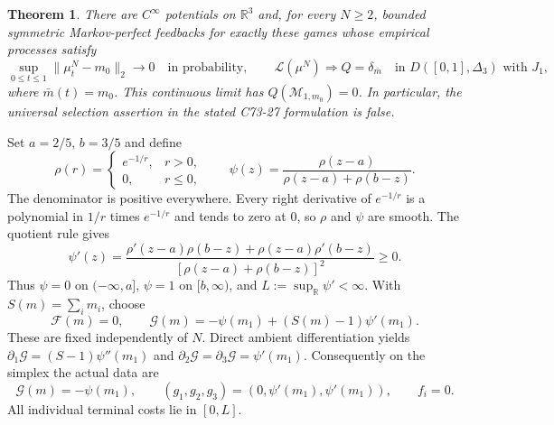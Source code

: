 \documentclass[11pt,a4paper]{article}
\newtheorem{theorem}{Theorem}
\newcommand{\R}{\mathbb R}
\begin{document}
\begin{theorem}\label{main}
There are $C^\infty$ potentials on $\R^3$ and, for every $N\ge2$,
bounded symmetric Markov-perfect feedbacks for exactly these games
whose empirical processes satisfy
\[
 \sup_{0\le t\le1}\|\mu_t^N-m_0\|_2\longrightarrow0
 \quad\text{in probability},\qquad
 \mathcal L(\mu^N)\Longrightarrow Q=\delta_{\bar m}
 \quad\text{in }D([0,1],\Delta_3)\text{ with }J_1,
\]
where $\bar m(t)=m_0$. This continuous limit has
$Q(\mathcal M_{1,m_0})=0$. In particular, the universal selection
assertion in the stated C73-27 formulation is false.
\end{theorem}

Set $a=2/5$, $b=3/5$ and define
\[
 \rho(r)=\begin{cases}e^{-1/r},&r>0,\\0,&r\le0,\end{cases}
 \qquad
 \psi(z)=\frac{\rho(z-a)}{\rho(z-a)+\rho(b-z)}.
\]
The denominator is positive everywhere. Every right derivative of
$e^{-1/r}$ is a polynomial in $1/r$ times $e^{-1/r}$ and tends to zero
at $0$, so $\rho$ and $\psi$ are smooth. The quotient rule gives
\[
 \psi'(z)=\frac{\rho'(z-a)\rho(b-z)+\rho(z-a)\rho'(b-z)}
 {[\rho(z-a)+\rho(b-z)]^2}\ge0.
\]
Thus $\psi=0$ on $(-\infty,a]$, $\psi=1$ on $[b,\infty)$,
and $L:=\sup_\R\psi'<\infty$. With $S(m)=\sum_i m_i$, choose
\begin{equation}\label{data}
 \mathcal F(m)=0,\qquad
 \mathcal G(m)=-\psi(m_1)+(S(m)-1)\psi'(m_1).
\end{equation}
These are fixed independently of $N$. Direct ambient differentiation
yields $\partial_1\mathcal G=(S-1)\psi''(m_1)$ and
$\partial_2\mathcal G=\partial_3\mathcal G=\psi'(m_1)$. Consequently
on the simplex the actual data are
\begin{equation}\label{costs}
 \mathcal G(m)=-\psi(m_1),\qquad
 (g_1,g_2,g_3)=(0,\psi'(m_1),\psi'(m_1)),\qquad f_i=0.
\end{equation}
All individual terminal costs lie in $[0,L]$.
\end{document}
